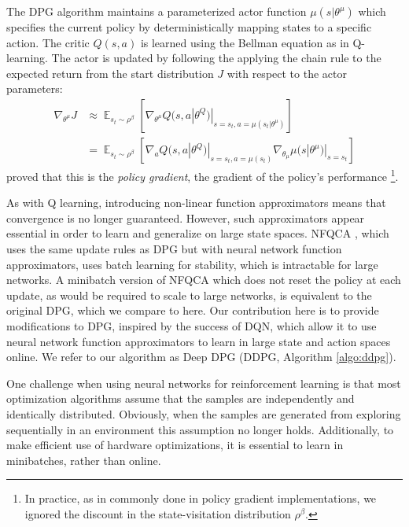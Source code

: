 \documentclass{article} %
\DeclareMathOperator{\E}{\mathbb{E}} %
\begin{document}
The DPG algorithm
maintains a parameterized actor function $\mu(s | \theta^\mu)$
which specifies the current policy by deterministically mapping states to a
specific action. The critic $Q(s, a)$ is learned using the
Bellman equation as in Q-learning. The actor is updated by following the
applying the chain rule to the expected return from the start distribution
$J$ with respect to the actor parameters:
\begin{equation}
  \begin{split}
  \nabla_{\theta^\mu} J &\approx
  \E_{s_t \sim \rho^\beta}\left[\nabla_{\theta^{\mu}}
    Q(s, a | \theta^Q)|_{s = s_t, a = \mu(s_t | \theta^{\mu})}
                   \right] \\
                 & =
    \E_{s_t \sim \rho^\beta}\left[\nabla_{a} Q(s, a | \theta^{Q})|_{s = s_t, a = \mu(s_t)}
    \nabla_{\theta_\mu} \mu(s | \theta^{\mu})|_{s = s_t} \right]
  \end{split}
\end{equation}
\citet{silver2014deterministic} proved that this is
the \emph{policy gradient}, the gradient of the policy's
performance \footnote{In practice, as in commonly done in policy gradient implementations,
we ignored the discount in the state-visitation distribution $\rho^\beta$.}.

As with Q learning, introducing non-linear function approximators
means that convergence is no longer guaranteed. However, such
approximators appear essential in order to learn and generalize on
large state spaces. NFQCA \citep{hafner2011reinforcement}, which uses
the same update rules as DPG but with neural network function
approximators, uses batch learning for stability, which is intractable
for large networks.
A minibatch version of NFQCA which does not reset
the policy at each update, as would be required to scale to large networks,
is equivalent to the original DPG, which we compare to here.
Our contribution here is to provide
modifications to DPG, inspired by the success of DQN, which allow it
to use neural network function approximators to learn in
large state and action spaces online. We refer to our algorithm as
Deep DPG (DDPG, Algorithm \ref{algo:ddpg}).

One challenge when using neural networks for reinforcement learning is
that most optimization algorithms assume that the samples are independently
and identically distributed. Obviously, when the samples are generated
from exploring sequentially in an environment this assumption no longer holds.
Additionally, to make efficient use of hardware optimizations, it is essential
to learn in minibatches, rather than online.
\end{document}
